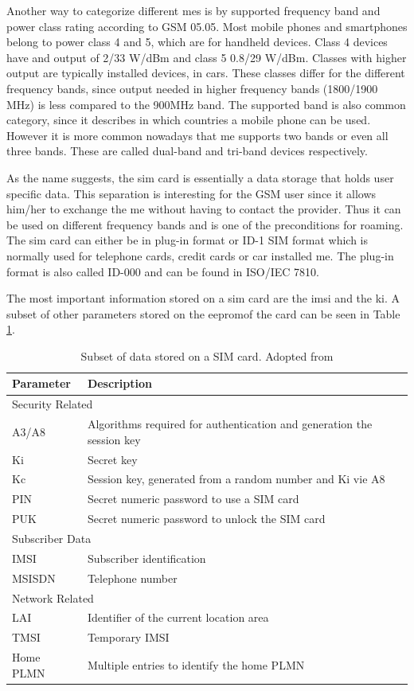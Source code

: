 Another way to categorize different \gls{me}s is by supported frequency band and power class rating according to GSM  05.05\cite{GSM0505}.
Most mobile phones and smartphones belong to power class 4 and 5, which are for handheld devices.
Class 4 devices have and output of 2/33 W/dBm and class 5 0.8/29 W/dBm.
Classes with higher output are typically installed devices, \eg in cars.
These classes differ for the different frequency bands, since output needed in higher frequency bands (1800/1900 MHz) is less compared to the 900MHz band.
The supported band is also common category, since it describes in which countries a mobile phone can be used.
However it is more common nowadays that \gls{me} supports two bands or even all three bands.
These are called dual-band and tri-band devices respectively.

As the name suggests, the \gls{sim} card is essentially a data storage that holds user specific data.
This separation is interesting for the GSM user since it allows him/her to exchange the \gls{me} without having to contact the provider.
Thus it can be used on different frequency bands and is one of the preconditions for roaming.
The \gls{sim} card can either be in plug-in format or ID-1 SIM format which is normally used for telephone cards, credit cards or car installed \gls{me}.
The plug-in format is also called ID-000 and can be found in ISO/IEC 7810\cite{ISO7810}.

The most important information stored on a \gls{sim} card are the \gls{imsi} and the \gls{ki}.
A subset of other parameters stored on the \gls{eeprom}of the card can be seen in Table \ref{tab:simdata}.

\begin{table}
\centering
\begin{tabular}{@{}ll@{}}
\toprule
Parameter		&Description\\
\midrule
\multicolumn{2}{l}{Security Related}\\
\midrule
A3/A8			&Algorithms required for authentication and generation the session key\\
Ki				&Secret key\\
Kc				&Session key, generated from a random number and Ki vie A8\\
PIN				&Secret numeric password to use a SIM card\\
PUK				&Secret numeric password to unlock the SIM card\\
\midrule
\multicolumn{2}{l}{Subscriber Data}\\
\midrule
IMSI			&Subscriber identification\\
MSISDN			&Telephone number\\
\midrule
\multicolumn{2}{l}{Network Related}\\
\midrule
LAI				&Identifier of the current location area\\
TMSI			&Temporary IMSI\\
Home PLMN		&Multiple entries to identify the home PLMN\\
\bottomrule
\end{tabular}
\caption{Subset of data stored on a SIM card. Adopted from \cite{protocols1999}}
\label{tab:simdata}
\end{table}

